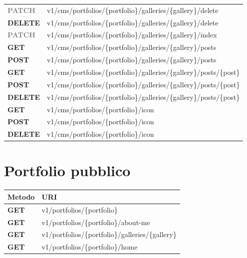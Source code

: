 \begin{table}[h]
\begin{tabularx}{\textwidth}{l X}
		  \textcolor{gray}{\textbf{PATCH}}     &      v1/cms/portfolios/\{portfolio\}/galleries/\{gallery\}/delete    \\
		  \textcolor{delete}{\textbf{DELETE}}   &       v1/cms/portfolios/\{portfolio\}/galleries/\{gallery\}/delete  \\
		  \textcolor{gray}{\textbf{PATCH}}    &       v1/cms/portfolios/\{portfolio\}/galleries/\{gallery\}/index    \\
		  \textcolor{get}{\textbf{GET}}     &   v1/cms/portfolios/\{portfolio\}/galleries/\{gallery\}/posts \\
		  \textcolor{post}{\textbf{POST}}        &    v1/cms/portfolios/\{portfolio\}/galleries/\{gallery\}/posts \\
		  \textcolor{get}{\textbf{GET}}    &    v1/cms/portfolios/\{portfolio\}/galleries/\{gallery\}/posts/\{post\}\\
		  \textcolor{post}{\textbf{POST}}     &   v1/cms/portfolios/\{portfolio\}/galleries/\{gallery\}/posts/\{post\} \\
		  \textcolor{delete}{\textbf{DELETE}}       &   v1/cms/portfolios/\{portfolio\}/galleries/\{gallery\}/posts/\{post\}\\
		  \textcolor{get}{\textbf{GET}}     &   v1/cms/portfolios/\{portfolio\}/icon \\
		  \textcolor{post}{\textbf{POST}}     &       v1/cms/portfolios/\{portfolio\}/icon \\
		  \textcolor{delete}{\textbf{DELETE}}    &      v1/cms/portfolios/\{portfolio\}/icon \\
		\hline
	\end{tabularx}
\end{table}

\section{Portfolio pubblico}

\begin{table}[H]
	\begin{tabularx}{\textwidth}{l X}
		\hline
		\textbf{Metodo} & \textbf{URI} \\
		\hline
		\textcolor{get}{\textbf{GET}} & v1/portfolios/\{portfolio\}\\
		\textcolor{get}{\textbf{GET}} & v1/portfolios/\{portfolio\}/about-me\\
		\textcolor{get}{\textbf{GET}} & v1/portfolios/\{portfolio\}/galleries/\{gallery\}\\
		\textcolor{get}{\textbf{GET}} & v1/portfolios/\{portfolio\}/home\\
		\hline
	\end{tabularx}
\end{table}

  